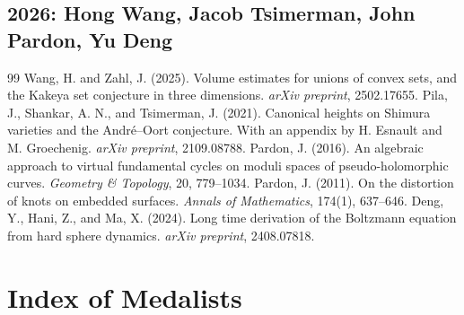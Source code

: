 \documentclass[12pt,a4paper]{book}
\theoremstyle{definition}
\theoremstyle{remark}
\begin{document}
\section*{2026: Hong Wang, Jacob Tsimerman, John Pardon, Yu Deng}
\begin{thebibliography}{99}
 Wang, H. and Zahl, J. (2025). Volume estimates for unions of convex sets, and the Kakeya set conjecture in three dimensions. \emph{arXiv preprint}, 2502.17655.
 Pila, J., Shankar, A. N., and Tsimerman, J. (2021). Canonical heights on Shimura varieties and the Andr\'e--Oort conjecture. With an appendix by H. Esnault and M. Groechenig. \emph{arXiv preprint}, 2109.08788.
 Pardon, J. (2016). An algebraic approach to virtual fundamental cycles on moduli spaces of pseudo-holomorphic curves. \emph{Geometry \& Topology}, 20, 779--1034.
 Pardon, J. (2011). On the distortion of knots on embedded surfaces. \emph{Annals of Mathematics}, 174(1), 637--646.
 Deng, Y., Hani, Z., and Ma, X. (2024). Long time derivation of the Boltzmann equation from hard sphere dynamics. \emph{arXiv preprint}, 2408.07818.
\end{thebibliography}

\chapter*{Index of Medalists}
\end{document}
